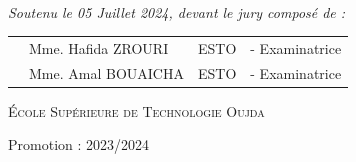 \begin{center}
\begin{minipage}{0.4\textwidth}
\vspace{1cm}

\end{minipage}\\[0.6cm]

{\large \textit{Soutenu le 05 Juillet 2024, devant le jury composé de : }}\\[0.5cm]


\begin{tabular}{p{1cm}lll}
 & \large Mme. Hafida \textsc{ZROURI}  & \large ESTO & \large - Examinatrice \\[0.1cm]
 & \large Mme. Amal \textsc{BOUAICHA}  & \large ESTO & \large - Examinatrice \\[0.1cm]
 
\end{tabular}

\vspace{1.5cm}


\textsc{École Supérieure de Technologie Oujda}

{\large Promotion : 2023/2024}
   
\end{center}



